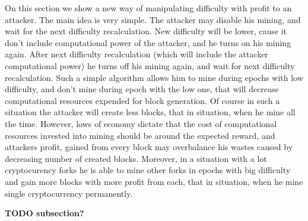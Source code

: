 \documentclass[number,preprint,review]{elsarticle}
\begin{document}
On this section we show a new way of manipulating difficulty with profit to an attacker.
The main idea is very simple.
The attacker may disable his mining, and wait for the next difficulty recalculation.
New difficulty will be lower, cause it don't include computational power of the attacker, and he turns on his mining again.
After next difficulty recalculation (which will include the attacker computational power) he turns off his mining again, and wait for next difficulty recalculation.
Such a simple algorithm allows him to mine during epochs with low difficulty, and don't mine during epoch with the low one, that will decrease computational resources expended for block generation.
Of course in such a situation the attacker will create less blocks, that in situation, when he mine all the time.
However, lows of economy dictate that the cost of computational resources invested into mining should be around the expected reward, and attackers profit, gained from every block may overbalance his wastes caused by decreasing number of created blocks.
Moreover, in a situation with a lot cryptocurency forks he is able to mine other forks in epochs with big difficulty and gain more blocks with more profit from each, that in situation, when he mine single cryptocurrency permanently.

 \textbf{TODO subsection?}
\end{document}
